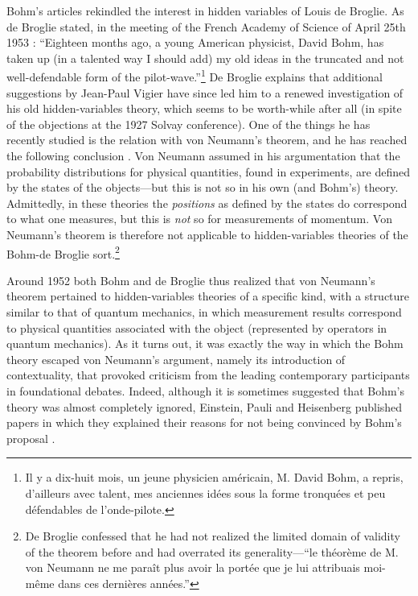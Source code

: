 \documentclass[11pt]{article}
\begin{document}
Bohm's articles rekindled the interest in hidden variables of Louis de Broglie. As de Broglie stated, in the meeting of the French Academy of Science of April 25th 1953 \cite[p.\@ 450]{debroglie}: ``Eighteen months ago, a young American physicist, David Bohm, has taken up (in a talented way I should add) my old ideas in the truncated and not well-defendable form of the pilot-wave.''\footnote{Il y a dix-huit mois, un jeune physicien am\'{e}ricain, M. David Bohm, a repris, d'ailleurs avec talent, mes anciennes id\'{e}es sous la forme tronqu\'{e}es et peu d\'{e}fendables de l'onde-pilote.} De Broglie explains that additional suggestions by Jean-Paul Vigier have since led him to a renewed investigation of his old hidden-variables theory, which seems to be worth-while after all (in spite of the objections at the 1927 Solvay conference). One of the things he has recently studied is the relation with von Neumann's theorem, and he has reached the following conclusion \cite[p.\@ 468]{debroglie}. Von Neumann assumed in his argumentation that the probability distributions for physical quantities, found in experiments, are defined by the states of the objects---but this is not so in his own (and Bohm's) theory. Admittedly, in these theories the \emph{positions} as defined by the states do correspond to what one measures, but this is \emph{not} so for measurements of momentum. Von Neumann's theorem is therefore not applicable to hidden-variables theories of the Bohm-de Broglie sort.\footnote{De Broglie confessed that he had not realized the limited domain of validity of the theorem before and had overrated its generality---``le th\'{e}or\`{e}me de M. von Neumann ne me para\^{i}t plus avoir la port\'{e}e que je lui attribuais moi-m\^{e}me dans ces derni\`{e}res ann\'{e}es.''}

Around 1952 both Bohm and de Broglie thus realized  that von Neumann's theorem pertained to hidden-variables theories of a specific kind, with a structure similar to that of quantum mechanics, in which measurement results correspond to physical quantities associated with the object (represented by operators in quantum mechanics). As it turns out, it was exactly the way in which the Bohm theory escaped von Neumann's argument, namely its introduction of contextuality, that provoked criticism from the leading contemporary participants in foundational debates. Indeed, although it is sometimes suggested that Bohm's theory was almost completely ignored, Einstein, Pauli and Heisenberg published papers in which they explained their reasons for not being convinced by Bohm's proposal \cite{myrvold}.
\end{document}
